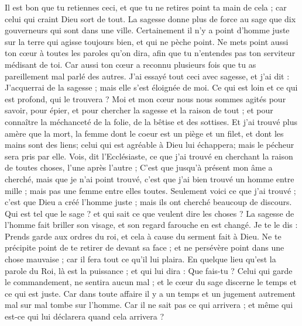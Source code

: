 \begin{multicols}{2}
Il est bon que tu retiennes ceci, et que tu ne retires point ta main de cela ; car celui qui craint Dieu sort de tout.
La sagesse donne plus de force au sage que dix gouverneurs qui sont dans une ville.
Certainement il n'y a point d'homme juste sur la terre qui agisse toujours bien, et qui ne pèche point.
Ne mets point aussi ton cœur à toutes les paroles qu'on dira, afin que tu n'entendes pas ton serviteur médisant de toi. 
Car aussi ton cœur a reconnu plusieurs fois que tu as pareillement mal parlé des autres. 
J'ai essayé tout ceci avec sagesse, et j'ai dit : J'acquerrai de la sagesse ; mais elle s'est éloignée de moi. 
Ce qui est loin et ce qui est profond, qui le trouvera ?
Moi et mon cœur nous nous sommes agités pour savoir, pour épier, et pour chercher la sagesse et la raison de tout ; et pour connaître la méchanceté de la folie, de la bêtise et des sottises. 
Et j'ai trouvé plus amère que la mort, la femme dont le coeur est un piège et un filet, et dont les mains sont des liens; celui qui est agréable à Dieu lui échappera; mais le pécheur sera pris par elle.
Vois, dit l'Ecclésiaste, ce que j'ai trouvé en cherchant la raison de toutes choses, l'une après l'autre ;
C'est que jusqu'à présent mon âme a cherché, mais que je n'ai point trouvé, c'est que j'ai bien trouvé un homme entre mille ; mais pas une femme entre elles toutes. 
Seulement voici ce que j'ai trouvé ; c'est que Dieu a créé l'homme juste ; mais ils ont cherché beaucoup de discours.
\VerseOne{}Qui est tel que le sage ? et qui sait ce que veulent dire les choses ? La sagesse de l'homme fait briller son visage, et son regard farouche en est changé.
Je te le dis : Prends garde aux ordres du roi, et cela à cause du serment fait à Dieu.
Ne te précipite point de te retirer de devant sa face ; et ne persévère point dans une chose mauvaise ; car il fera tout ce qu'il lui plaira. 
En quelque lieu qu'est la parole du Roi, là est la puissance ; et qui lui dira : Que fais-tu ? 
Celui qui garde le commandement, ne sentira aucun mal ; et le cœur du sage discerne le temps et ce qui est juste. 
Car dans toute affaire il y a un temps et un jugement autrement mal sur mal tombe sur l'homme. 
Car il ne sait pas ce qui arrivera ; et même qui est-ce qui lui déclarera quand cela arrivera ? 

\end{multicols}

